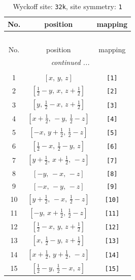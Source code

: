 \documentclass[fleqn,8pt]{jsarticle}
\begin{document}
\renewcommand{\arraystretch}{1.2}
\begin{longtable}{ccc}
\caption{Wyckoff site: {\tt 32k}, site symmetry: {\tt 1}}
 \\
 \hline \hline
No. & position & mapping \\ \hline \endfirsthead

\multicolumn{2}{l}{\tablename\ \thetable{}} \\
 \hline \hline
No. & position & mapping \\ \hline \endhead

 \hline \hline
\multicolumn{2}{r}{\footnotesize\it continued ...} \\ \endfoot

 \hline \hline
\multicolumn{2}{r}{} \\ \endlastfoot

1 & $\left[ x,\, y,\, z \right]$ & {\tt [1]} \\ \hline
2 & $\left[ \frac{1}{2} - y,\, x,\, z + \frac{1}{2} \right]$ & {\tt [2]} \\ \hline
3 & $\left[ y,\, \frac{1}{2} - x,\, z + \frac{1}{2} \right]$ & {\tt [3]} \\ \hline
4 & $\left[ x + \frac{1}{2},\, - y,\, \frac{1}{2} - z \right]$ & {\tt [4]} \\ \hline
5 & $\left[ - x,\, y + \frac{1}{2},\, \frac{1}{2} - z \right]$ & {\tt [5]} \\ \hline
6 & $\left[ \frac{1}{2} - x,\, \frac{1}{2} - y,\, z \right]$ & {\tt [6]} \\ \hline
7 & $\left[ y + \frac{1}{2},\, x + \frac{1}{2},\, - z \right]$ & {\tt [7]} \\ \hline
8 & $\left[ - y,\, - x,\, - z \right]$ & {\tt [8]} \\ \hline
9 & $\left[ - x,\, - y,\, - z \right]$ & {\tt [9]} \\ \hline
10 & $\left[ y + \frac{1}{2},\, - x,\, \frac{1}{2} - z \right]$ & {\tt [10]} \\ \hline
11 & $\left[ - y,\, x + \frac{1}{2},\, \frac{1}{2} - z \right]$ & {\tt [11]} \\ \hline
12 & $\left[ \frac{1}{2} - x,\, y,\, z + \frac{1}{2} \right]$ & {\tt [12]} \\ \hline
13 & $\left[ x,\, \frac{1}{2} - y,\, z + \frac{1}{2} \right]$ & {\tt [13]} \\ \hline
14 & $\left[ x + \frac{1}{2},\, y + \frac{1}{2},\, - z \right]$ & {\tt [14]} \\ \hline
15 & $\left[ \frac{1}{2} - y,\, \frac{1}{2} - x,\, z \right]$ & {\tt [15]} \\ \hline

\end{longtable}
\end{document}
